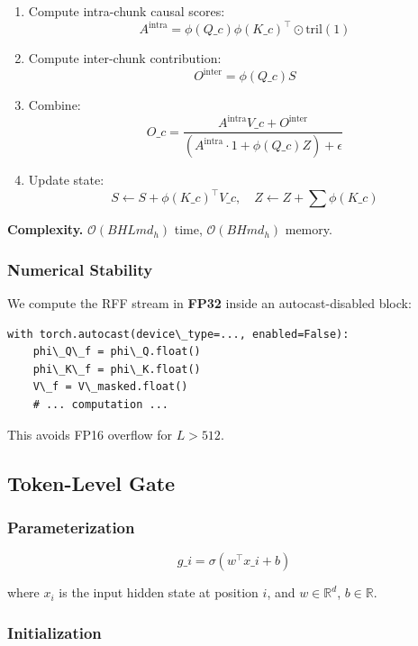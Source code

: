 \begin{enumerate}
\item Compute intra-chunk causal scores:
  $$
  A^\text{intra} = \phi(Q\_c) \phi(K\_c)^\top \odot \text{tril}(1)
  \tag{4.7}
  $$

\item Compute inter-chunk contribution:
  $$
  O^\text{inter} = \phi(Q\_c) S
  \tag{4.8}
  $$

\item Combine:
  $$
  O\_c = \frac{A^\text{intra} V\_c + O^\text{inter}}{(A^\text{intra} \cdot 1 + \phi(Q\_c) Z) + \epsilon}
  \tag{4.9}
  $$

\item Update state:
  $$
  S \leftarrow S + \phi(K\_c)^\top V\_c, \quad Z \leftarrow Z + \sum \phi(K\_c)
  \tag{4.10}
  $$

\end{enumerate}
\textbf{Complexity.} $\mathcal{O}(B H L m d_h)$ time, $\mathcal{O}(B H m d_h)$ memory.

\subsubsection{Numerical Stability}

We compute the RFF stream in \textbf{FP32} inside an autocast-disabled block:

\begin{lstlisting}
with torch.autocast(device\_type=..., enabled=False):
    phi\_Q\_f = phi\_Q.float()
    phi\_K\_f = phi\_K.float()
    V\_f = V\_masked.float()
    # ... computation ...
\end{lstlisting}

This avoids FP16 overflow for $L > 512$.

\subsection{Token-Level Gate}

\subsubsection{Parameterization}

\[
g\_i = \sigma(w^\top x\_i + b)
\tag{4.11}
\]

where $x_i$ is the input hidden state at position $i$, and $w \in \mathbb{R}^d$, 
$b \in \mathbb{R}$.

\subsubsection{Initialization}

